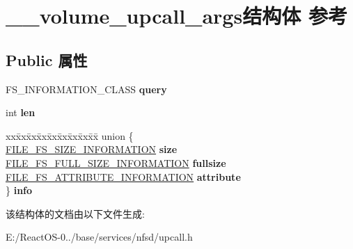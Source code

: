 \hypertarget{struct____volume__upcall__args}{}\section{\+\_\+\+\_\+volume\+\_\+upcall\+\_\+args结构体 参考}
\label{struct____volume__upcall__args}
\subsection*{Public 属性}
\begin{DoxyCompactItemize}
\item 
\mbox{\label{struct____volume__upcall__args_a5ca29e64a82cba792f87b4d6c95bac77}} 
F\+S\+\_\+\+I\+N\+F\+O\+R\+M\+A\+T\+I\+O\+N\+\_\+\+C\+L\+A\+SS {\bfseries query}
\item 
\mbox{\label{struct____volume__upcall__args_a5a1a67e2bc68ceae448fad31b8293ee1}} 
int {\bfseries len}
\item 
\mbox{\label{struct____volume__upcall__args_a7289d4c9fbecb4fb6aa23bfa8b3798e8}} 
\begin{tabbing}
xx\=xx\=xx\=xx\=xx\=xx\=xx\=xx\=xx\=\kill
union \{\\
\>\hyperlink{struct___f_i_l_e___f_s___s_i_z_e___i_n_f_o_r_m_a_t_i_o_n}{FILE\_FS\_SIZE\_INFORMATION} {\bfseries size}\\
\>\hyperlink{struct___f_i_l_e___f_s___f_u_l_l___s_i_z_e___i_n_f_o_r_m_a_t_i_o_n}{FILE\_FS\_FULL\_SIZE\_INFORMATION} {\bfseries fullsize}\\
\>\hyperlink{struct___f_i_l_e___f_s___a_t_t_r_i_b_u_t_e___i_n_f_o_r_m_a_t_i_o_n}{FILE\_FS\_ATTRIBUTE\_INFORMATION} {\bfseries attribute}\\
\} {\bfseries info}\\

\end{tabbing}\end{DoxyCompactItemize}


该结构体的文档由以下文件生成\+:\begin{DoxyCompactItemize}
\item 
E\+:/\+React\+O\+S-\/0../base/services/nfsd/upcall.\+h\end{DoxyCompactItemize}
